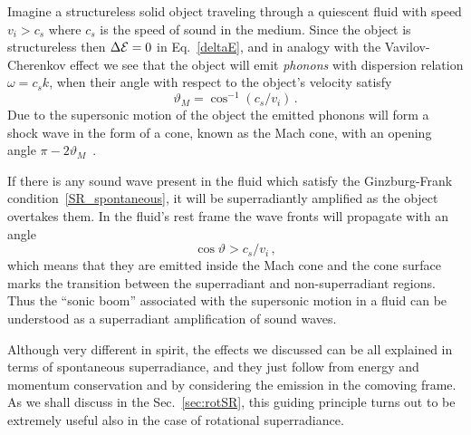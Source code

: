 \documentclass[11pt]{article}
\numberwithin{equation}{section} %
\begin{document}
Imagine a structureless solid object traveling through a quiescent fluid with speed $v_i>c_s$ where $c_s$ is the speed of sound in the medium. Since the object is structureless then $\Delta {\cal E}=0$ in Eq.~\eqref{deltaE}, and in analogy with the Vavilov-Cherenkov effect we see that the object will emit \emph{phonons} with dispersion relation $\omega=c_s k$, when their angle with respect to the object's velocity satisfy
\begin{equation}
 \vartheta_M=\cos^{-1}(c_s/v_i)\,.
\end{equation}
Due to the supersonic motion of the object the emitted phonons will form a shock wave in the form of a cone, known as the Mach cone, with an opening angle $\pi-2\vartheta_M$~\cite{Landau:book_fluids}.

If there is any sound wave present in the fluid which satisfy the Ginzburg-Frank condition~\eqref{SR_spontaneous}, it will be superradiantly amplified as the object overtakes them. In the fluid's rest frame the wave fronts will propagate with an angle
\begin{equation}
 \cos\vartheta>c_s/v_i\,,
\end{equation}
which means that they are emitted inside the Mach cone and the cone surface marks the transition between the superradiant and non-superradiant regions. Thus the ``sonic boom'' associated with the supersonic motion in a fluid can be understood as a superradiant amplification of sound waves.

Although very different in spirit, the effects we discussed can be all explained in terms of spontaneous superradiance, and they just follow from energy and momentum conservation and by considering the emission in the comoving frame. As we shall discuss in the Sec.~\ref{sec:rotSR}, this guiding principle turns out to be extremely useful also in the case of rotational superradiance.


\end{document}
